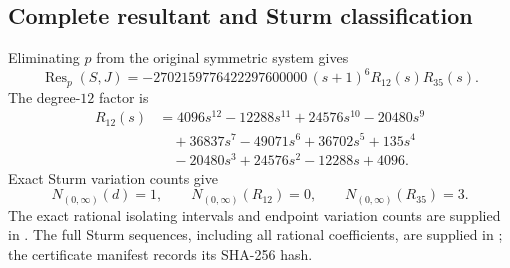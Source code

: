 \subsection{Complete resultant and Sturm classification}
Eliminating $p$ from the original symmetric system gives
\[
\operatorname{Res}_p(S,J)=-2702159776422297600000\,(s+1)^6R_{12}(s)R_{35}(s).
\]
The degree-$12$ factor is
\begin{align*}
R_{12}(s) &= 4096s^{12} - 12288s^{11} + 24576s^{10} - 20480s^{9} \\
&\quad  + 36837s^{7} - 49071s^{6} + 36702s^{5} + 135s^{4} \\
&\quad  - 20480s^{3} + 24576s^{2} - 12288s + 4096.
\end{align*}
Exact Sturm variation counts give
\[
N_{(0,\infty)}(d)=1,\qquad N_{(0,\infty)}(R_{12})=0,\qquad N_{(0,\infty)}(R_{35})=3.
\]
The exact rational isolating intervals and endpoint variation counts are supplied in . The full Sturm sequences, including all rational coefficients, are supplied in ; the certificate manifest records its SHA-256 hash.
\begingroup\scriptsize
